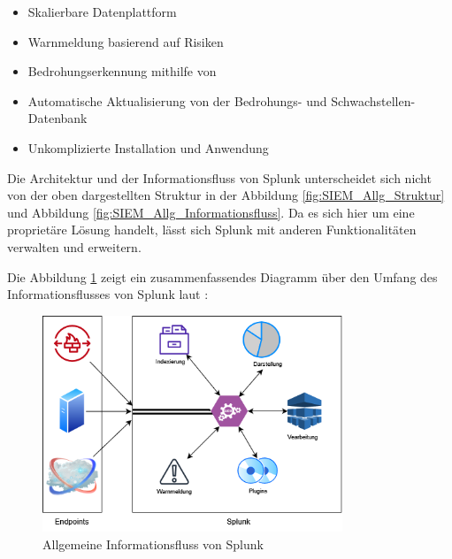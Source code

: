 \begin{itemize}[noitemsep]
   \item Skalierbare Datenplattform
   \item Warnmeldung basierend auf Risiken
   \item Bedrohungserkennung mithilfe von 
   \item Automatische Aktualisierung von der Bedrohungs- und Schwachstellen-Datenbank
   \item Unkomplizierte Installation und Anwendung
\end{itemize}

Die Architektur und der Informationsfluss von Splunk unterscheidet sich nicht von der oben dargestellten Struktur in der Abbildung \ref{fig:SIEM_Allg_Struktur} und Abbildung \ref{fig:SIEM_Allg_Informationsfluss}. Da es sich hier um eine proprietäre Lösung handelt, lässt sich Splunk mit anderen Funktionalitäten verwalten und erweitern.

Die Abbildung \ref{fig:Allgemein_Splunk} zeigt ein zusammenfassendes Diagramm über den Umfang des Informationsflusses von Splunk laut \cite{Splunk_platform}:


\begin{figure}[H]
   \centering
   \includegraphics[width=0.8\textwidth]{assets/Splunk.drawio.png}
   \caption[Allgemeine Informationsfluss von Splunk]
   {Allgemeine Informationsfluss von Splunk}
   \label{fig:Allgemein_Splunk}
   \centering
\end{figure}

